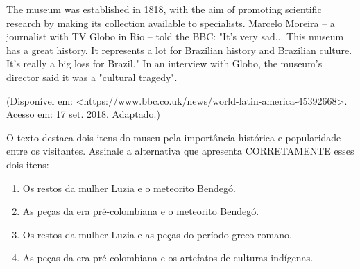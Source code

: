 The museum was established in 1818, with the aim of promoting scientific research by making its collection available to specialists. Marcelo Moreira -- a journalist with TV Globo in Rio -- told the BBC: "It's very sad... This museum has a great history. It represents a lot for Brazilian history and Brazilian culture. It's really a big loss for Brazil." In an interview with Globo, the museum's director said it was a "cultural tragedy".

\begin{center}(Disponível em: <https://www.bbc.co.uk/news/world-latin-america-45392668>. Acesso em: 17 set. 2018. Adaptado.)\end{center}

O texto destaca dois itens do museu pela importância histórica e popularidade entre os visitantes. Assinale a alternativa que apresenta CORRETAMENTE esses dois itens:\begin{enumerate}
\item Os restos da mulher Luzia e o meteorito Bendegó.
\item As peças da era pré-colombiana e o meteorito Bendegó.
\item Os restos da mulher Luzia e as peças do período greco-romano.
\item As peças da era pré-colombiana e os artefatos de culturas indígenas.\end{enumerate}
